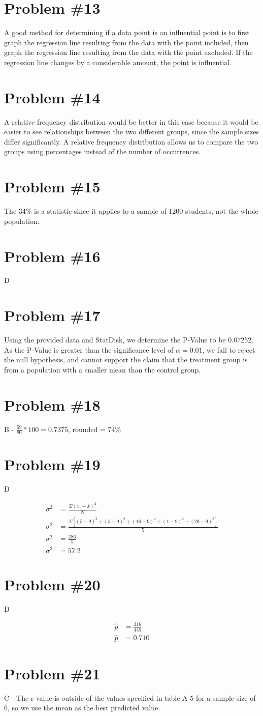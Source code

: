 \documentclass[12pt,fleqn]{article}
\newcommand{\problem}[1]{\vspace{5ex}\section*{Problem \##1}}
\begin{document}
\problem{13}
A good method for determining if a data point is an influential point is to first graph the regression line resulting from the data with the point included, then graph the regression line resulting from the data with the point excluded. If the regression line changes by a considerable amount, the point is influential.


\problem{14}
A relative frequency distribution would be better in this case because it would be easier to see relationships between the two different groups, since the sample sizes differ significantly. A relative frequency distribution allows us to compare the two groups using percentages instead of the number of occurrences.


\problem{15}
The 34\% is a statistic since it applies to a sample of 1200 students, not the whole population.


\problem{16}
D


\problem{17}
Using the provided data and StatDisk, we determine the P-Value to be 0.07252. As the P-Value is greater than the significance level of $\alpha = 0.01$, we fail to reject the null hypothesis, and cannot support the claim that the treatment group is from a population with a smaller mean than the control group.


\problem{18}
B \-- $\frac{59}{80} * 100 = 0.7375$, rounded = 74\%


\problem{19}
D

\begin{align*}
  \sigma^2 &= \frac{\Sigma{(x_i - \bar{x})}^2}{N} \\
  \sigma^2 &= \frac{\Sigma{[{(5 - 9)}^2 + {(3 - 9)}^2 + {(16 - 9)}^2 + {(1 - 9)}^2 + {(20 - 9)}^2]}}{5} \\
  \sigma^2 &= \frac{286}{5} \\
  \sigma^2 &= 57.2
\end{align*}


\problem{20}
D

\begin{align*}
  \hat{p} &= \frac{316}{445} \\
  \hat{p} &= 0.710
\end{align*}

\problem{21}
C \-- The r value is outside of the values specified in table A-5 for a sample size of 6, so we use the mean as the best predicted value.
\end{document}
